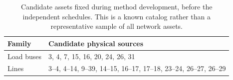 \begin{table}[t]\centering\small
\caption{Candidate assets fixed during method development, before the independent schedules. This is a known catalog rather than a representative sample of all network assets.}
\label{tab:source-catalog}
\begin{tabularx}{\columnwidth}{@{}lX@{}}\toprule
Family & Candidate physical sources\\\midrule
Load buses & 3, 4, 7, 15, 16, 20, 24, 26, 31\\
Lines & 3--4, 4--14, 9--39, 14--15, 16--17, 17--18, 23--24, 26--27, 26--29\\
\bottomrule\end{tabularx}\end{table}
